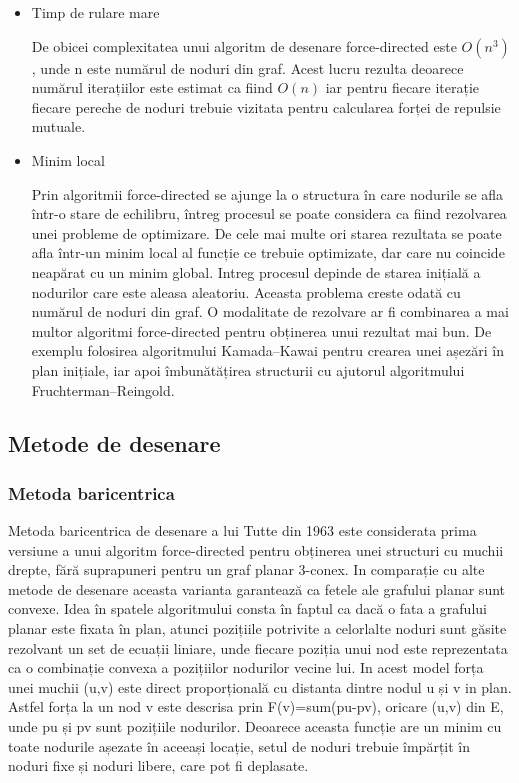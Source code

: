 \begin{itemize}
\item Timp de rulare mare

De obicei complexitatea unui algoritm de desenare force-directed este \(O(n^3)\), unde n este numărul de noduri din graf. 
Acest lucru rezulta deoarece numărul iterațiilor este estimat ca fiind \(O(n)\) iar pentru fiecare iterație fiecare 
pereche de noduri trebuie vizitata pentru calcularea forței de repulsie mutuale.

\item Minim local

Prin algoritmii force-directed se ajunge la o structura în care nodurile se afla într-o stare de echilibru, întreg procesul se 
poate considera ca fiind rezolvarea unei probleme de optimizare.
De cele mai multe ori starea rezultata se poate afla într-un minim local al funcție ce trebuie optimizate, dar care nu 
coincide neapărat cu un minim global. Intreg procesul depinde de starea inițială a nodurilor care este aleasa aleatoriu. 
Aceasta problema creste odată cu numărul de noduri din graf. O modalitate de rezolvare ar fi combinarea a mai multor 
algoritmi force-directed pentru obținerea unui rezultat mai bun. De exemplu folosirea algoritmului Kamada–Kawai pentru 
crearea unei așezări în plan inițiale, iar apoi îmbunătățirea structurii cu ajutorul algoritmului Fruchterman–Reingold.

\end{itemize}

\subsection{Metode de desenare}
\subsubsection{Metoda baricentrica}
Metoda baricentrica de desenare a lui Tutte din 1963 este considerata prima versiune a unui algoritm force-directed 
pentru obținerea unei structuri cu muchii drepte, fără suprapuneri pentru un graf planar 3-conex. In comparație cu alte 
metode de desenare aceasta varianta garantează ca fetele ale grafului planar sunt convexe. Idea în spatele algoritmului 
consta în faptul ca dacă o fata a grafului planar este fixata în plan, atunci pozițiile potrivite a celorlalte noduri sunt 
găsite rezolvant un set de ecuații liniare, unde fiecare poziția unui nod este reprezentata ca o combinație convexa a 
pozițiilor nodurilor vecine lui. In acest model forța unei muchii (u,v) este direct proporțională cu distanta dintre 
nodul u și v in plan. Astfel forța la un nod v este descrisa prin F(v)=sum(pu-pv), oricare (u,v) din E, unde pu și pv 
sunt pozițiile nodurilor. Deoarece aceasta funcție are un minim cu toate nodurile așezate în aceeași locație, setul 
de noduri trebuie împărțit în noduri fixe și noduri libere, care pot fi deplasate.

